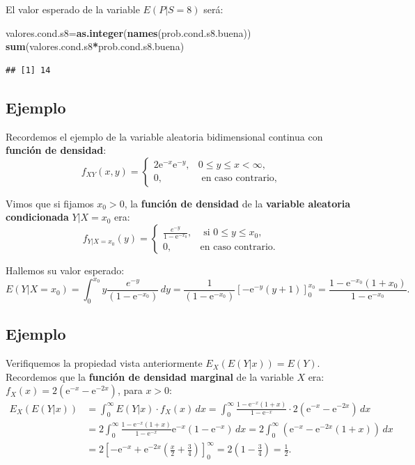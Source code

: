 \documentclass[]{book}
\newenvironment{Shaded}{\begin{snugshade}}{\end{snugshade}}
\newcommand{\KeywordTok}[1]{\textcolor[rgb]{0.13,0.29,0.53}{\textbf{#1}}}
\newcommand{\NormalTok}[1]{#1}
\newcommand{\OperatorTok}[1]{\textcolor[rgb]{0.81,0.36,0.00}{\textbf{#1}}}
\begin{document}
El valor esperado de la variable \(E(P|S=8)\) será:

\begin{Shaded}
\begin{Highlighting}[]
\NormalTok{valores.cond.s8=}\KeywordTok{as.integer}\NormalTok{(}\KeywordTok{names}\NormalTok{(prob.cond.s8.buena))}
\KeywordTok{sum}\NormalTok{(valores.cond.s8}\OperatorTok{*}\NormalTok{prob.cond.s8.buena)}
\end{Highlighting}
\end{Shaded}

\begin{verbatim}
## [1] 14
\end{verbatim}

\hypertarget{ejemplo-71}{%
\subsection{Ejemplo}\label{ejemplo-71}}

Recordemos el ejemplo de la variable aleatoria bidimensional continua con \textbf{función de densidad}:
\[
f_{XY}(x,y)=\begin{cases}
2 \mathrm{e}^{-x}\mathrm{e}^{-y}, & 0\leq y\leq x < \infty,\\
0, & \mbox{ en caso contrario,}
\end{cases}
\]

Vimos que si fijamos \(x_0>0\), la \textbf{función de densidad} de la \textbf{variable aleatoria condicionada} \(Y|X=x_0\) era:
\[
f_{Y|X=x_0}(y)=\begin{cases}
\frac{e^{-y}}{1-\mathrm{e}^{-x_0}}, & \mbox{ si }0\leq y\leq x_0, \\
0, & \mbox{en caso contrario.}
\end{cases}
\]

Hallemos su valor esperado:
\[
E(Y|X=x_0)=\int_0^{x_0} y \frac{e^{-y}}{(1-\mathrm{e}^{-x_0})}\, dy=\frac{1}{(1-\mathrm{e}^{-x_0})}\left[-\mathrm{e}^{-y} (y+1)\right]_0^{x_0} = \frac{1-\mathrm{e}^{-x_0}(1+x_0)}{1-\mathrm{e}^{-x_0}}.
\]

\hypertarget{ejemplo-72}{%
\subsection{Ejemplo}\label{ejemplo-72}}

Verifiquemos la propiedad vista anteriormente \(E_X(E(Y|x))=E(Y)\). Recordemos que la \textbf{función de densidad marginal} de la variable \(X\) era: \(f_X(x)=2\left(\mathrm{e}^{-x}-\mathrm{e}^{-2x}\right)\), para \(x>0\):
\[
\begin{array}{rl}
E_X(E(Y|x)) & =\int_0^\infty E(Y|x)\cdot f_X(x)\, dx = \int_0^\infty \frac{1-\mathrm{e}^{-x}(1+x)}{1-\mathrm{e}^{-x}}\cdot 2\left(\mathrm{e}^{-x}-\mathrm{e}^{-2x}\right)\, dx 
\\ & =  2\int_0^\infty \frac{1-\mathrm{e}^{-x}(1+x)}{1-\mathrm{e}^{-x}} \mathrm{e}^{-x}\left(1-\mathrm{e}^{-x}\right)\, dx = 2 \int_0^\infty \left(\mathrm{e}^{-x}-\mathrm{e}^{-2x}(1+x)\right)\, dx \\ & = 2\left[-\mathrm{e}^{-x}+\mathrm{e}^{-2 x}
   \left(\frac{x}{2}+\frac{3}{4}\right)\right]_0^\infty = 2 \left(1-\frac{3}{4}\right)=\frac{1}{2}.
\end{array}
\]
\end{document}
